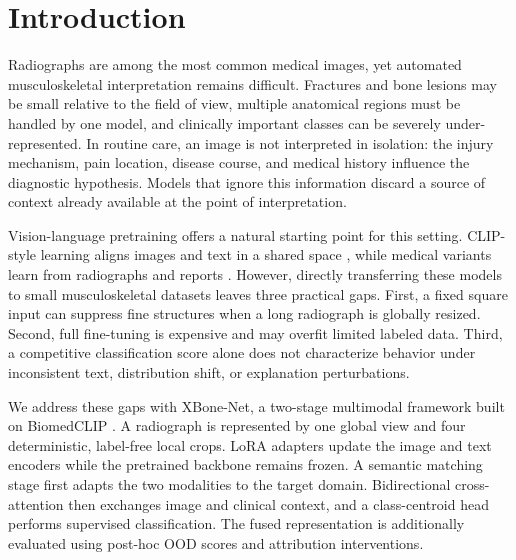 \documentclass[runningheads]{llncs}
\begin{document}
\section{Introduction}

Radiographs are among the most common medical images, yet automated musculoskeletal interpretation remains difficult. Fractures and bone lesions may be small relative to the field of view, multiple anatomical regions must be handled by one model, and clinically important classes can be severely under-represented. In routine care, an image is not interpreted in isolation: the injury mechanism, pain location, disease course, and medical history influence the diagnostic hypothesis. Models that ignore this information discard a source of context already available at the point of interpretation.

Vision-language pretraining offers a natural starting point for this setting. CLIP-style learning aligns images and text in a shared space \cite{CLIP}, while medical variants learn from radiographs and reports \cite{ConVIRT,GLoRIA,MedCLIP,BiomedCLIP}. However, directly transferring these models to small musculoskeletal datasets leaves three practical gaps. First, a fixed square input can suppress fine structures when a long radiograph is globally resized. Second, full fine-tuning is expensive and may overfit limited labeled data. Third, a competitive classification score alone does not characterize behavior under inconsistent text, distribution shift, or explanation perturbations.

We address these gaps with XBone-Net, a two-stage multimodal framework built on BiomedCLIP \cite{BiomedCLIP}. A radiograph is represented by one global view and four deterministic, label-free local crops. LoRA adapters \cite{Hu2022LoRA} update the image and text encoders while the pretrained backbone remains frozen. A semantic matching stage first adapts the two modalities to the target domain. Bidirectional cross-attention then exchanges image and clinical context, and a class-centroid head performs supervised classification. The fused representation is additionally evaluated using post-hoc OOD scores and attribution interventions.
\end{document}
